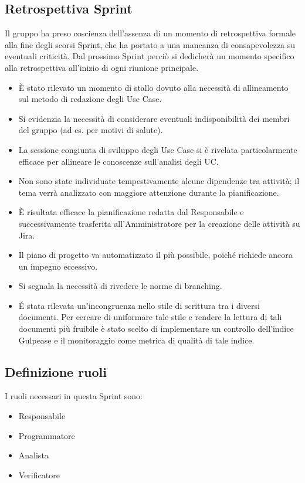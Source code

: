\documentclass[a4paper,12pt]{article}
\begin{document}
\subsection{Retrospettiva Sprint}
Il gruppo ha preso coscienza dell'assenza di un momento di retrospettiva formale alla fine degli scorsi Sprint, che ha portato a una mancanza di consapevolezza su eventuali criticità. Dal prossimo Sprint perciò si dedicherà un momento specifico alla retrospettiva all'inizio di ogni riunione principale.
\begin{itemize}[noitemsep]
    \item È stato rilevato un momento di stallo dovuto alla necessità di allineamento sul metodo di redazione degli Use Case.
    \item Si evidenzia la necessità di considerare eventuali indisponibilità dei membri del gruppo (ad es. per motivi di salute).
    \item La sessione congiunta di sviluppo degli Use Case si è rivelata particolarmente efficace per allineare le conoscenze sull'analisi degli UC.
    \item Non sono state individuate tempestivamente alcune dipendenze tra attività; il tema verrà analizzato con maggiore attenzione durante la pianificazione.
    \item È risultata efficace la pianificazione redatta dal Responsabile e successivamente trasferita all'Amministratore per la creazione delle attività su Jira.
    \item Il piano di progetto va automatizzato il più possibile, poiché richiede ancora un impegno eccessivo.
    \item Si segnala la necessità di rivedere le norme di branching.
    \item É stata rilevata un'incongruenza nello stile di scrittura tra i diversi documenti. Per cercare di uniformare tale stile e rendere la lettura di tali documenti più fruibile è stato scelto di implementare un controllo dell'indice Gulpease e il monitoraggio come metrica di qualità di tale indice.
\end{itemize}


\subsection{Definizione ruoli}
I ruoli necessari in questa Sprint sono:
\begin{itemize}[noitemsep]
    \item Responsabile
    \item Programmatore
    \item Analista
    \item Verificatore
\end{itemize}
\end{document}
